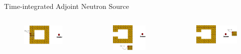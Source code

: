 \documentclass{beamer}
\begin{document}
\begin{frame}{Time-integrated Adjoint Neutron Source}
	\begin{columns}
        \begin{figure}
	\centering
	\includegraphics[scale=0.20]{mesh-0.jpg}
	\end{figure}
		\vspace{0.6cm}
        \begin{figure}
	\centering
	\includegraphics[scale=0.20]{mesh-3.jpg}
	\end{figure}
		\vspace{-0.4cm}
        \begin{figure}
	\centering
	\includegraphics[scale=0.20]{mesh-5.jpg}
	\end{figure}
	\end{columns}
\end{frame}
\end{document}
